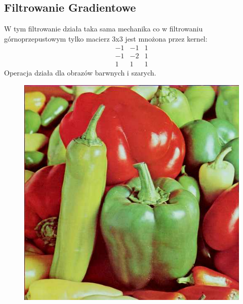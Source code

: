 \documentclass{article}
\begin{document}
\FloatBarrier
\subsection{Filtrowanie Gradientowe}

W tym filtrowanie działa taka sama mechanika co w filtrowaniu górnoprzepustowym tylko macierz 3x3 jest mnożona przez kernel: 
\begin{equation*}
\begin{matrix}
-1 & -1 & 1 \\
-1 & -2 & 1 \\
 1 &  1 & 1
\end{matrix}
\end{equation*}
Operacja działa dla obrazów barwnych i szarych.\\
\begin{figure}[!htb]
\centering
\includegraphics[scale=0.2]{img/peppers_24bit.png}

\end{figure}
\end{document}
